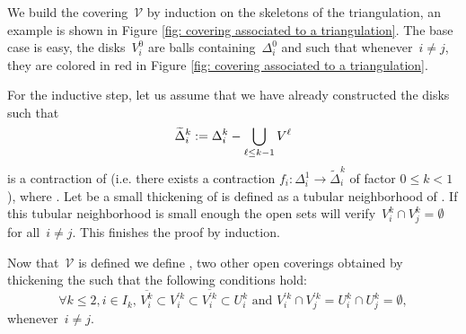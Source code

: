\documentclass[10pt]{amsart}
\begin{document}
\medskip

We build the covering~$\mathcal{V}$ by induction on the skeletons of the triangulation, an example is shown in Figure \ref{fig: covering associated to a triangulation}. The base case is easy, the disks~$V_i^0$ are balls containing~$\Delta_i^0$ and such that  whenever~$i\neq j$, they are colored in red in Figure \ref{fig: covering associated to a triangulation}. 

For the inductive step, let us assume that we have already constructed the disks  such that
$$\smash[t]{\widetilde{\Delta}_i^k:=\Delta_i^k-\bigcup_{\ell \leq k-1} V^\ell}$$
is a contraction of  (i.e. there exists a contraction $f_i : \Delta^1_i \to \widetilde{\Delta}^k_i$ of factor $0 \leq k < 1$), where . Let  be a small thickening of  is defined as a tubular neighborhood of . If this tubular neighborhood is small enough the open sets will verify~$V_i^k \cap V_j^k=\emptyset$ for all~$i\neq j$. This finishes the proof by induction.

\medskip

Now that~$\mathcal{V}$ is defined we define , two other open coverings obtained by thickening the  such that the following conditions hold:
$$ \forall k\leq 2, i\in I_k,\, \overline{V_i^k}\subset V_i^{'k} \subset \overline{V_i^{'k}}\subset U_i^k \text{ and } V_i^{'k}\cap V_j^{'k}=U_i^k\cap U_j^k=\emptyset,$$
whenever~$i\neq j$.
\end{document}
